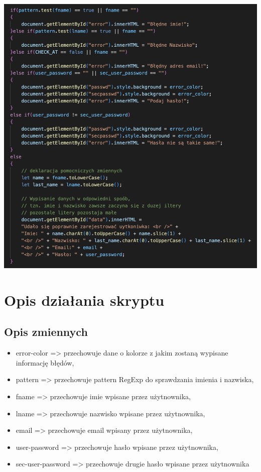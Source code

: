 \documentclass[12pt, letterpaper]{article}
\begin{document}
\begin{center}
	\includegraphics[scale=0.5]{js2}
\end{center}

\section{Opis działania skryptu}

\subsection{Opis zmiennych}
\begin{itemize}
\item error-color => przechowuje dane o kolorze z jakim zostaną wypisane informację błędów,
\item pattern => przechowuje pattern RegExp do sprawdzania imienia i nazwiska,
\item fname => przechowuje imie wpisane przez użytnownika,
\item lname => przechowuje nazwisko wpisane przez użytnownika,
\item email => przechowuje email wpisany przez użytnownika,
\item user-password => przechowuje hasło wpisane przez użytnownika,
\item sec-user-password => przechowuje drugie hasło wpisane przez użytnownika
\end{itemize}
\end{document}
